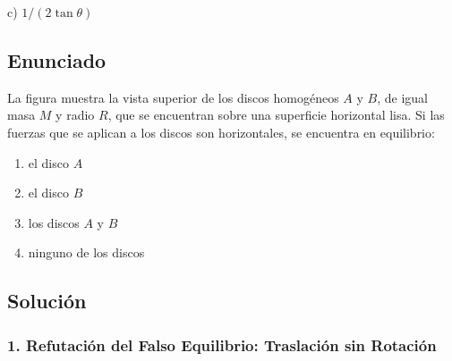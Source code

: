 \documentclass[12pt, a4paper]{article}
\begin{document}
\begin{tcolorbox}[colback=green!5!white, colframe=green!50!black, title=Respuesta Final]
\centering \Large c) $1/(2\tan \theta)$
\end{tcolorbox}

\newpage

\subsection*{Enunciado}
La figura muestra la vista superior de los discos homogéneos $A$ y $B$, de igual masa $M$ y radio $R$, que se encuentran sobre una superficie horizontal lisa. Si las fuerzas que se aplican a los discos son horizontales, se encuentra en equilibrio:
\begin{enumerate}[label=\alph*)]
    \item el disco $A$
    \item el disco $B$
    \item los discos $A$ y $B$
    \item ninguno de los discos
\end{enumerate}

\subsection*{Solución}

\subsubsection*{1. Refutación del Falso Equilibrio: Traslación sin Rotación}
\end{document}
